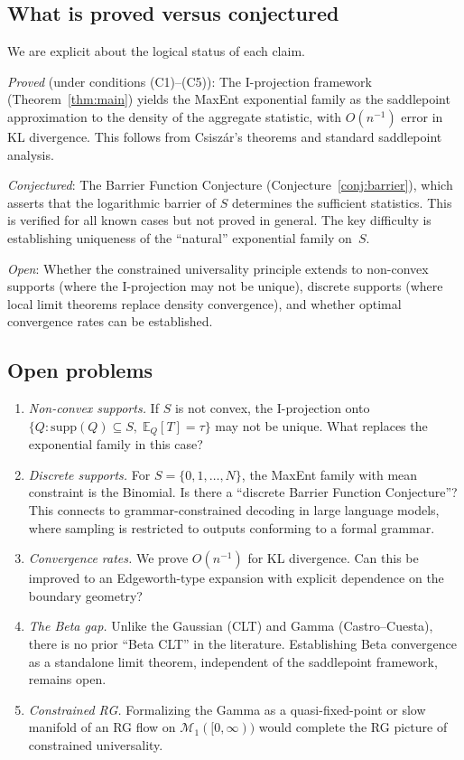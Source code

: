 \documentclass[aps,pre,twocolumn,superscriptaddress,nofootinbib]{revtex4-2}
\theoremstyle{definition}
\theoremstyle{remark}
\newcommand{\E}{\mathbb{E}}
\newcommand{\supp}{\mathrm{supp}}
\begin{document}
\subsection{What is proved versus conjectured}

We are explicit about the logical status of each claim.

\emph{Proved} (under conditions (C1)--(C5)): The I-projection framework
(Theorem~\ref{thm:main}) yields the MaxEnt exponential family as the
saddlepoint approximation to the density of the aggregate statistic, with
$O(n^{-1})$ error in KL divergence.  This follows from Csisz\'{a}r's theorems
and standard saddlepoint analysis.

\emph{Conjectured}: The Barrier Function Conjecture
(Conjecture~\ref{conj:barrier}), which asserts that the logarithmic barrier of
$S$ determines the sufficient statistics. This is verified for all known cases
but not proved in general.  The key difficulty is establishing uniqueness of
the ``natural'' exponential family on~$S$.

\emph{Open}: Whether the constrained universality principle extends to
non-convex supports (where the I-projection may not be unique), discrete
supports (where local limit theorems replace density convergence), and whether
optimal convergence rates can be established.

\subsection{Open problems}

\begin{enumerate}
\item \emph{Non-convex supports.}  If $S$ is not convex, the I-projection onto
$\{Q:\supp(Q)\subseteq S,\;\E_Q[T]=\tau\}$ may not be unique.  What replaces
the exponential family in this case?

\item \emph{Discrete supports.}  For $S=\{0,1,\ldots,N\}$, the MaxEnt family
with mean constraint is the Binomial.  Is there a ``discrete Barrier Function
Conjecture''?  This connects to grammar-constrained decoding in large language
models, where sampling is restricted to outputs conforming to a formal grammar.

\item \emph{Convergence rates.}  We prove $O(n^{-1})$ for KL divergence.  Can
this be improved to an Edgeworth-type expansion with explicit dependence on the
boundary geometry?

\item \emph{The Beta gap.}  Unlike the Gaussian (CLT) and Gamma
(Castro--Cuesta), there is no prior ``Beta CLT'' in the literature.
Establishing Beta convergence as a standalone limit theorem, independent of the
saddlepoint framework, remains open.

\item \emph{Constrained RG.}  Formalizing the Gamma as a quasi-fixed-point or
slow manifold of an RG flow on $\mathcal{M}_1([0,\infty))$ would complete the
RG picture of constrained universality.
\end{enumerate}
\end{document}

